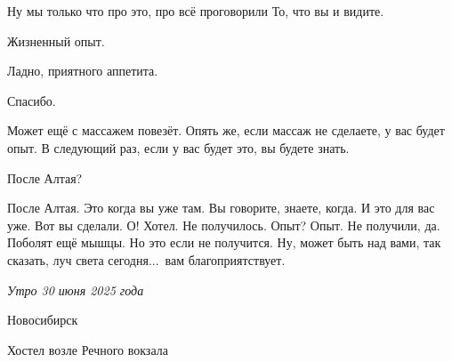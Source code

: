 \A
Ну мы только что про это, про всё проговорили То, что вы и видите.

\I
Жизненный опыт.

\A
Ладно, приятного аппетита.

\I
Спасибо.

\A
Может ещё с массажем повезёт.
Опять же, если массаж не сделаете, у вас будет опыт.
В следующий раз, если у вас будет это, вы будете знать.

\I
После Алтая?

\A
После Алтая.
Это когда вы уже там.
Вы говорите, знаете, когда.
И это для вас уже.
Вот вы сделали.
О! Хотел. Не получилось.
Опыт?
Опыт.
Не получили, да.
Поболят ещё мышцы.
Но это если не получится.
Ну, может быть над вами,
так сказать, луч света сегодня...\
вам благоприятствует.


\kern2cm
\it
\lineskip=7pt
\hskip6cm Утро 30 июня 2025 года \par
\hskip5.1cm Новосибирск \par
\hskip4cm Хостел возле Речного вокзала \par
\vfil
\eject
\shipout\vbox{}
\bye
